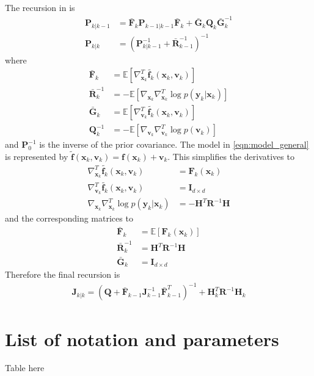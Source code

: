 \documentclass{article}
\renewcommand{\vec}[1]{\ensuremath{{\boldsymbol #1}}}
\newcommand{\mat}[1]{\ensuremath{\boldsymbol{#1}}}
\begin{document}
The recursion in \cite{Bergman2001} is
\begin{subequations}
\begin{align}
	\mat P_{k|k-1} &= \bar{\mat F}_k\mat P_{k-1|k-1}\bar{\mat F}_k + \bar{\mat G}_k\mat Q_k \bar{\mat G}_k^{-1} \\
		\mat P_{k|k} &= \left(\mat P_{k|k-1}^{-1} + \bar{\mat R}_{k-1}^{-1}\right)^{-1}
\end{align}
\end{subequations}
where
\begin{align}
	\bar{\mat F}_k &= \mathbb E \left[ \nabla_{\vec x_k}^T \tilde{\vec f_k}(\vec x_k,\vec v_k)\right] \\
	\bar{\mat R}_k^{-1} &= -\mathbb E\left[ \nabla_{\vec x_k}\nabla_{\vec x_k}^T \log p(\vec y_k|\vec x_k) \right] \\
	\bar{\mat G}_k &= \mathbb E \left[ \nabla_{\vec v_k}^T \tilde{\vec f_k}(\vec x_k,\vec v_k)\right] \\
	\mat Q_k^{-1} &= -\mathbb E \left[ \nabla_{\vec v_k}\nabla_{\vec v_k}^T \log p(\vec v_k) \right]
\end{align}
and $\mat P_0^{-1}$ is the inverse of the prior covariance. The model in \eqref{eqn:model_general} is represented by $\tilde{\vec f}(\vec x_k,\vec v_k) = \vec f(\vec x_k) + \vec v_k$. This simplifies the derivatives to
\begin{align}
	\nabla_{\vec x_k}^T \tilde{\vec f_k}(\vec x_k,\vec v_k) &= \mat F_k(\vec x_k) \\
	\nabla_{\vec v_k}^T \tilde{\vec f_k}(\vec x_k,\vec v_k) &= \mat I_{d\times d} \\
	\nabla_{\vec x_k}\nabla_{\vec x_k}^T \log p(\vec y_k|\vec x_k) &= -\mat H^T\mat R^{-1} \mat H 
\end{align}
and the corresponding matrices to	
\begin{align}
	\bar{\mat F}_k &= \mathbb E\left[ \mat F_k(\vec x_k)\right] \label{eqn:pcrb_term_F}\\
	\bar{\mat R}_k^{-1} &= \mat H^T\mat R^{-1} \mat H \\
	\bar{\mat G}_k &= \mat I_{d\times d} 
\end{align}
Therefore the final recursion is
\begin{align}
	\mat J_{k|k} = \left( \mat Q + \bar{\mat F}_{k-1} \mat J_{k-1}^{-1} \bar{\mat F}_{k-1}^T\right)^{-1} + \mat H_k^T \mat R^{-1} \mat H_k
\end{align}

\section{List of notation and parameters}
\label{sec:parameter_table}

Table here


\small


\end{document}

